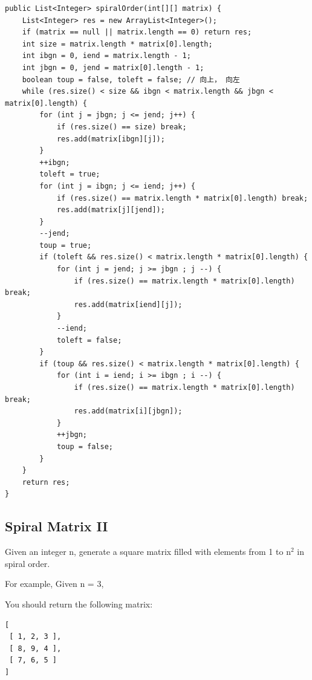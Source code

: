\documentclass[12pt]{book}
\begin{document}
\begin{lstlisting}
public List<Integer> spiralOrder(int[][] matrix) {
    List<Integer> res = new ArrayList<Integer>();
    if (matrix == null || matrix.length == 0) return res;
    int size = matrix.length * matrix[0].length;
    int ibgn = 0, iend = matrix.length - 1;
    int jbgn = 0, jend = matrix[0].length - 1;
    boolean toup = false, toleft = false; // 向上， 向左
    while (res.size() < size && ibgn < matrix.length && jbgn < matrix[0].length) {
        for (int j = jbgn; j <= jend; j++) {
            if (res.size() == size) break;
            res.add(matrix[ibgn][j]);
        }
        ++ibgn;
        toleft = true;
        for (int j = ibgn; j <= iend; j++) {
            if (res.size() == matrix.length * matrix[0].length) break;
            res.add(matrix[j][jend]);
        }
        --jend;
        toup = true;
        if (toleft && res.size() < matrix.length * matrix[0].length) {
            for (int j = jend; j >= jbgn ; j --) {
                if (res.size() == matrix.length * matrix[0].length) break;
                res.add(matrix[iend][j]);
            }
            --iend;
            toleft = false;
        }
        if (toup && res.size() < matrix.length * matrix[0].length) {
            for (int i = iend; i >= ibgn ; i --) {
                if (res.size() == matrix.length * matrix[0].length) break;
                res.add(matrix[i][jbgn]);
            }
            ++jbgn;
            toup = false;
        }
    }
    return res;
}
\end{lstlisting}

\subsection{Spiral Matrix II}
\label{sec-20-1-8}
Given an integer n, generate a square matrix filled with elements from 1 to n$^{\text{2}}$ in spiral order.

For example,
Given n = 3,

You should return the following matrix:
\lstset{language=java,label= ,caption= ,numbers=none}
\begin{lstlisting}
[
 [ 1, 2, 3 ],
 [ 8, 9, 4 ],
 [ 7, 6, 5 ]
]
\end{lstlisting}
\end{document}
